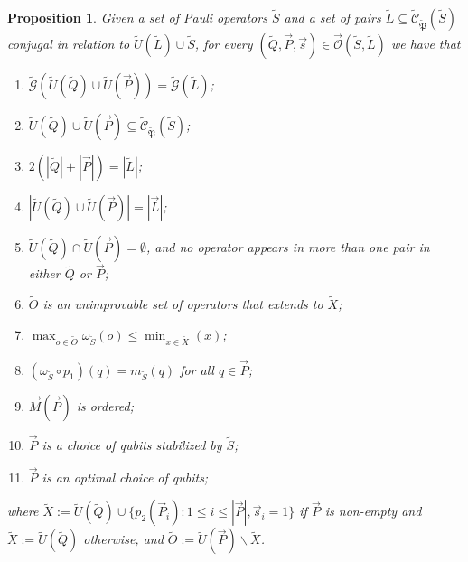 \documentclass{amsbook}
\theoremstyle{plain}
\newtheorem{proposition}{Proposition}
\theoremstyle{definition}
\theoremstyle{remark}
\newcommand{\lst}{\vec}
\newcommand{\set}{\tilde}
\newcommand{\genfun}{\tilde{\mathcal{G}}}
\newcommand{\pauligroup}{{\set{\mathfrak{P}}}}
\newcommand{\centralizer}{\set{\mathcal{C}}}
\newcommand{\unpack}{\set U}
\newcommand{\optimizer}{\lst{\mathcal{O}}}
\newcommand{\om}{\omega}
\newcommand{\paren}[1]{\left(#1\right)}
\begin{document}
\begin{proposition}
\label{proposition:properties of the algorithm}
Given a set of Pauli operators $\set S$ and a set of pairs $\set L\subseteq\centralizer_\pauligroup(\set S)$ conjugal in relation to $\set U(\set L)\cup\set S$, for every $(\set Q,\lst P,\lst s)\in\optimizer(\set S,\set L)$ we have that
\begin{enumerate}
\item $\genfun\paren{\set U(\set Q)\cup\set U(\lst P)}=\genfun(\set L)$;
\item $\set U(\set Q)\cup\set U(\lst P)\subseteq\centralizer_\pauligroup(\set S)$;
\item $2(|\set Q|+|\lst P|)=|\set L|$;
\item $|\set U(\set Q)\cup\set U(\lst P)|=|\lst L|$;
\item $\set U(\set Q)\cap\set U(\lst P)=\emptyset$, and no operator appears in more than one pair in either $\set Q$ or $\lst P$;
\item $\set O$ is an unimprovable set of operators that extends to $\set X$;
\item $\max_{o\in\set O}\om_{\set S}(o)\le\min_{x\in\set X}(x)$;
\item $(\om_{\set S}\circ p_1)(q)=m_{\set S}(q)$ for all $q\in\lst P$;
\item $\lst M(\lst P)$ is ordered;
\item $\lst P$ is a choice of qubits stabilized by $\set S$;
\item $\lst P$ is an optimal choice of qubits;
\end{enumerate}
where $\set X := \unpack(\set Q)\cup\{p_2(\lst P_i):1 \le i \le |\lst P|, \lst s_i=1\}$ if $\lst P$ is non-empty and $\set X := \unpack(\set Q)$ otherwise, and $\set O:=\unpack(\lst P)\backslash\set X$.
\end{proposition}
\end{document}
